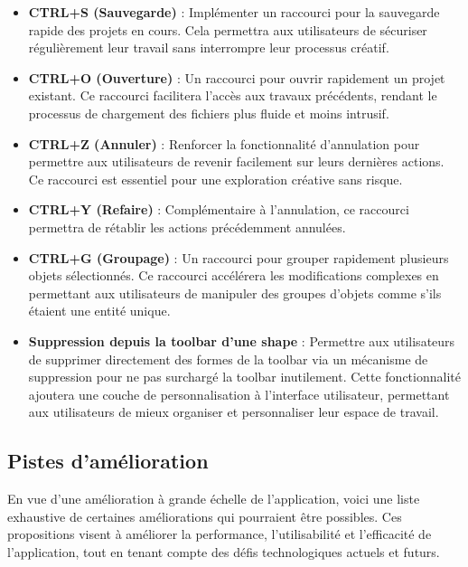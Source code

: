 \documentclass[a4paper,11pt]{article}
\begin{document}
\begin{itemize}
    \item \textbf{CTRL+S (Sauvegarde)} : Implémenter un raccourci pour la sauvegarde rapide des projets en cours. Cela permettra aux utilisateurs de sécuriser régulièrement leur travail sans interrompre leur processus créatif.
    
    \item \textbf{CTRL+O (Ouverture)} : Un raccourci pour ouvrir rapidement un projet existant. Ce raccourci facilitera l'accès aux travaux précédents, rendant le processus de chargement des fichiers plus fluide et moins intrusif.
    
    \item \textbf{CTRL+Z (Annuler)} : Renforcer la fonctionnalité d'annulation pour permettre aux utilisateurs de revenir facilement sur leurs dernières actions. Ce raccourci est essentiel pour une exploration créative sans risque.
    
    \item \textbf{CTRL+Y (Refaire)} : Complémentaire à l'annulation, ce raccourci permettra de rétablir les actions précédemment annulées.
    
    \item \textbf{CTRL+G (Groupage)} : Un raccourci pour grouper rapidement plusieurs objets sélectionnés. Ce raccourci accélérera les modifications complexes en permettant aux utilisateurs de manipuler des groupes d'objets comme s'ils étaient une entité unique.
    
    \item \textbf{Suppression depuis la toolbar d'une shape} : Permettre aux utilisateurs de supprimer directement des formes de la toolbar via un mécanisme de suppression pour ne pas surchargé la toolbar inutilement. Cette fonctionnalité ajoutera une couche de personnalisation à l'interface utilisateur, permettant aux utilisateurs de mieux organiser et personnaliser leur espace de travail.
\end{itemize}


\subsection{Pistes d'amélioration}
En vue d'une amélioration à grande échelle de l'application, voici une liste exhaustive de certaines améliorations qui pourraient être possibles. Ces propositions visent à améliorer la performance, l'utilisabilité et l'efficacité de l'application, tout en tenant compte des défis technologiques actuels et futurs.
\end{document}
